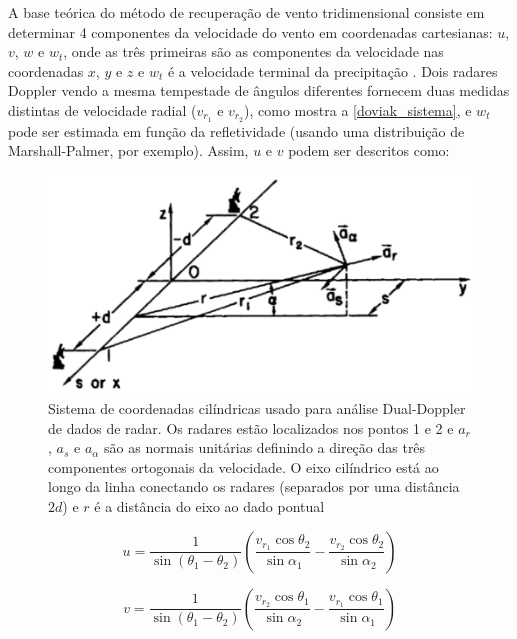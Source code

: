 A base teórica do método de recuperação de vento tridimensional consiste em determinar 4 componentes da velocidade do vento em coordenadas cartesianas: $u$, $v$, $w$ e $w_t$, onde as três primeiras são as componentes da velocidade nas coordenadas $x$, $y$ e $z$ e $w_t$ é a velocidade terminal da precipitação \cite{Rinehart1997}. Dois radares Doppler vendo a mesma tempestade de ângulos diferentes fornecem duas medidas distintas de velocidade radial ($v_{r_1}$ e $v_{r_2}$), como mostra a \autoref{doviak_sistema}, e $w_t$ pode ser estimada em função da refletividade (usando uma distribuição de Marshall-Palmer, por exemplo). Assim, $u$ e $v$ podem ser descritos como:

\begin{figure}[htb]
	\begin{center}
		\caption{Sistema de coordenadas cilíndricas usado para análise Dual-Doppler de dados de radar. Os radares estão localizados nos pontos 1 e 2 e $a_r$, $a_s$ e $a_\alpha$ são as normais unitárias definindo a direção das três componentes ortogonais da velocidade. O eixo cilíndrico está ao longo da linha conectando os radares (separados por uma distância $2d$) e $r$ é a distância do eixo ao dado pontual} 
		\label{doviak_sistema}
		\includegraphics[width=0.8\columnwidth]{figs/system_doviak.png}
	\end{center}
\end{figure}

\begin{equation}
u=\frac{1}{\sin{(\theta_1 - \theta_2)}}\left(\frac{v_{r_1}\cos{\theta_2}}{\sin{\alpha_1}}-\frac{v_{r_2}\cos{\theta_2}}{\sin{\alpha_2}}\right)
\end{equation}

\begin{equation}
v=\frac{1}{\sin{(\theta_1 - \theta_2)}}\left(\frac{v_{r_2}\cos{\theta_1}}{\sin{\alpha_2}}-\frac{v_{r_1}\cos{\theta_1}}{\sin{\alpha_1}}\right)
\end{equation}


